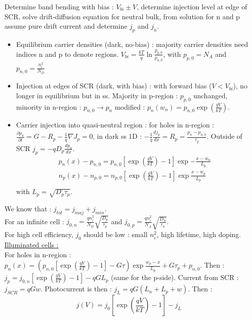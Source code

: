 \documentclass[../main.tex]{subfiles}
\begin{document}
Determine band bending with bias : $V_{bi} \pm V$, determine injection level at edge of SCR, solve drift-diffusion equation for neutral bulk, from solution for n and p assume pure drift current and determine $j_p$
 and $j_n$.\\
 \begin{itemize}
     \item Equilibrium carrier densities (dark, no-bias) : majority carrier densities need indices n and p to denote regions. $V_{bi} = \frac{kT}{q} \ln \frac{p_{p,0}}{p_{n,0}}$, with $p_{p,0} = N_A$ and $p_{n,0} = \frac{n_i^2}{N_D}$
     \item Injection at edges of SCR (dark, with bias) : with forward bias ($V<V_{bi}$), no longer in equilibrium but in ss. Majority in p-region : $p_{p,0}$ unchanged, minority in n-region : $p_{n,0} \rightarrow p_n$ modified : $p_n(w_n) = p_{n,0} \exp(\frac{qV}{kT})$.
     \item Carrier injection into quasi-neutral region : for holes in n-region : $\frac{\partial p_n}{\partial t} = G-R_p - \frac{1}{q} \nabla J_p = 0$, in dark ss 1D : $-\frac{1}{q} \frac{d j_p}{dx} = R_p = \frac{p_n-p_{n,0}}{\tau_p}$. Outside of SCR $j_p = -q D_p \frac{dp_n}{dx}$.\begin{equation}
         \begin{gathered}
             p_n(x) - p_{n,0} = p_{n,0} [\exp(\frac{qV}{kT})-1] \exp{-\frac{x-w_n}{L_p}}\\
             n_p(x) - n_{p,0} = n_{p,0} [\exp(\frac{qV}{kT})-1] \exp{\frac{x-w_p}{L_p}}\\
         \end{gathered}
     \end{equation}
     with $L_p = \sqrt{D_p \tau_p}$.
 \end{itemize}

 We know that : $j_{tot} = j_{maj} + j_{min}$. \\
 For an infinite cell : $j_{0,n} = \frac{qn_i^2}{N_D} \sqrt{\frac{D_p}{\tau_p}}$ and $j_{0,p} = \frac{q n_i^2}{N_A} \sqrt{ \frac{D_n}{\tau_n}}$.\\
 For high cell efficiency, $j_0$ should be low : small $n_i^2$, high lifetime, high doping. \\


 \underline{Illuminated cells :}\\
 For holes in n-region : $p_n(x) = (p_{n,0}[\exp(\frac{qV}{kT})-1]-G\tau)\exp\frac{w_p-x}{L_p} + G\tau_p + p_{n,0}$. Then : $j_p = j_{0,n} [\exp(\frac{qV}{kT})-1]-qGL_p$ (same for the p-side). Current from SCR : $j_{SCR} = qGw$. Photocurrent is then : $j_L = qG(L_n + L_p + w)$. Then : \begin{equation}
     j(V) = j_0 [\exp(\frac{qV}{kT})-1] - j_L
 \end{equation}
\end{document}

